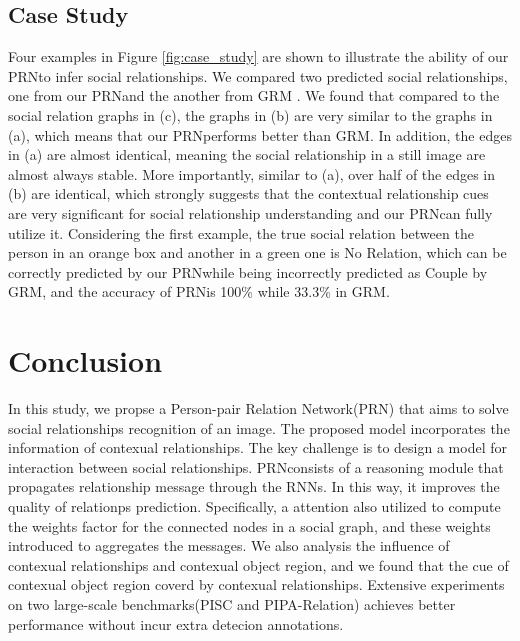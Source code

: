 \documentclass{article}
\newcommand{\PRN}{{\sf PRN}}
\begin{document}

\subsection{Case Study}\label{section:cs}

Four examples in Figure \ref{fig:case_study} are shown to illustrate the ability of our \PRN to infer social relationships. We compared two predicted social relationships, one from our \PRN and the another from GRM \cite{DBLP:conf/ijcai/WangCRYCL18}. We found that compared to the social relation graphs in (c), the graphs in (b) are very similar to the graphs in (a), which means that our \PRN performs better than GRM. In addition, the edges in (a) are almost identical, meaning the social relationship in a still image are almost always stable. More importantly, similar to (a), over half of the edges in (b) are identical, which strongly suggests that the contextual relationship cues are very significant for social relationship understanding and our \PRN can fully utilize it. Considering the first example, the true social relation between the person in an orange box and another in a green one is No Relation, which can be correctly predicted by our \PRN while being incorrectly predicted as Couple by GRM, and the accuracy of \PRN is 100\% while 33.3\% in GRM.

\section{Conclusion}
In this study, we propse a Person-pair Relation Network(\PRN) that aims to solve social relationships recognition of an image. The proposed model incorporates the information of contexual relationships. The key challenge is to design a model for interaction between social relationships. \PRN consists of a reasoning module that propagates relationship message through the RNNs. In this way, it improves the quality of relationps prediction. Specifically, a attention also utilized to compute the weights factor for the connected nodes in a social graph, and these weights introduced to aggregates the messages. We also analysis the influence of contexual relationships and contexual object region, and we found that the cue of contexual object region coverd by contexual relationships. Extensive experiments on two large-scale benchmarks(PISC and PIPA-Relation) achieves better performance  without incur extra detecion annotations.

\newpage


\end{document}
